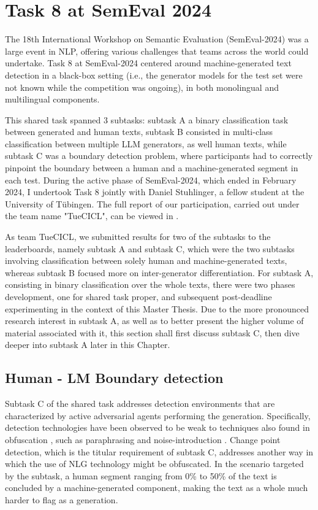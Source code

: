 \section{Task 8 at SemEval 2024}
\label{sec:task}

The 18th International Workshop on Semantic Evaluation (SemEval-2024) was a large event in NLP, offering various challenges that teams across the world could undertake.
Task 8 at SemEval-2024 \citep{wang2024semeval} centered around machine-generated text detection in a black-box setting (i.e., the generator models for the test set were not known while the competition was ongoing), in both monolingual and multilingual components.

This shared task spanned 3 subtasks: subtask A a binary classification task between generated and human texts, subtask B consisted in multi-class classification between multiple LLM generators, as well human texts, while subtask C was a boundary detection problem, where participants had to correctly pinpoint the boundary between a human and a machine-generated segment in each test.
During the active phase of SemEval-2024, which ended in February 2024, I undertook Task 8 jointly with Daniel Stuhlinger, a fellow student at the University of Tübingen.
The full report of our participation, carried out under the team name "TueCICL", can be viewed in \citet{stuhlinger-winkler-2024-tuecicl}.

As team TueCICL, we submitted results for two of the subtasks to the leaderboards, namely subtask A and subtask C, which were the two subtasks involving classification between solely human and machine-generated texts, whereas subtask B focused more on inter-generator differentiation.
For subtask A, consisting in binary classification over the whole texts, there were two phases development, one for shared task proper, and subsequent post-deadline experimenting in the context of this Master Thesis.
Due to the more pronounced research interest in subtask A, as well as to better present the higher volume of material associated with it, this section shall first discuss subtask C, then dive deeper into subtask A later in this Chapter.

\subsection{Human - LM Boundary detection}

Subtask C of the shared task addresses detection environments that are characterized by active adversarial agents performing the generation.
Specifically, detection technologies have been observed to be weak to techniques also found in obfuscation \citep{macko2024authorship}, such as paraphrasing \citep{krishna2024paraphrasing} and noise-introduction \citep{wang2021adversarial}.
Change point detection, which is the titular requirement of subtask C, addresses another way in which the use of NLG technology might be obfuscated.
In the scenario targeted by the subtask, a human segment ranging from 0\% to 50\% of the text is concluded by a machine-generated component, making the text as a whole much harder to flag as a generation.

